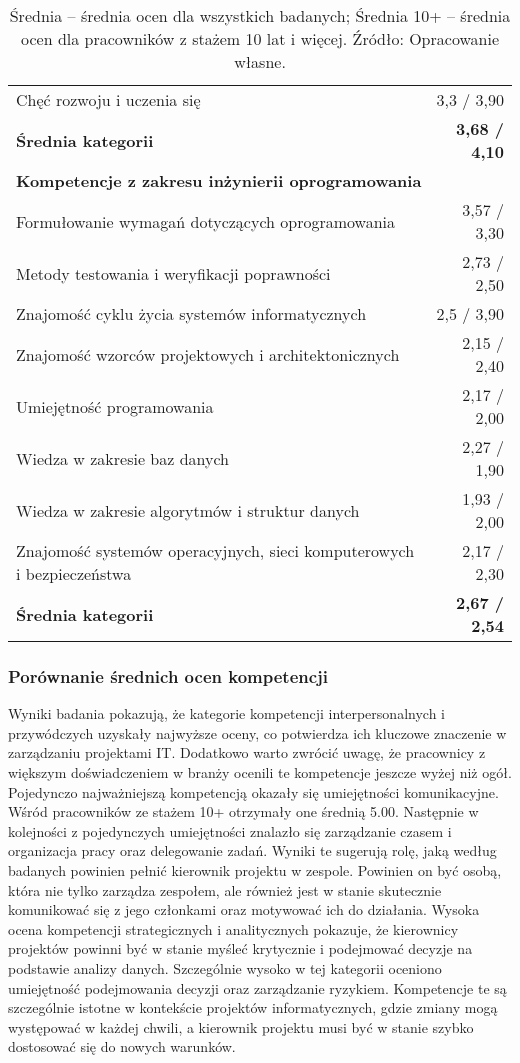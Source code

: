 \begin{table}[htbp]
\begin{tabular}{p{8cm} r}
Chęć rozwoju i uczenia się & 3{,}3 / 3{,}90 \\
\textbf{Średnia kategorii} & \textbf{3{,}68 / 4{,}10} \\
\midrule
\multicolumn{2}{l}{\textbf{Kompetencje z zakresu inżynierii oprogramowania}} \\
Formułowanie wymagań dotyczących oprogramowania & 3{,}57 / 3{,}30 \\
Metody testowania i weryfikacji poprawności & 2{,}73 / 2{,}50 \\
Znajomość cyklu życia systemów informatycznych & 2{,}5 / 3{,}90 \\
Znajomość wzorców projektowych i architektonicznych & 2{,}15 / 2{,}40 \\
Umiejętność programowania & 2{,}17 / 2{,}00 \\
Wiedza w zakresie baz danych & 2{,}27 / 1{,}90 \\
Wiedza w zakresie algorytmów i struktur danych & 1{,}93 / 2{,}00 \\
Znajomość systemów operacyjnych, sieci komputerowych i bezpieczeństwa & 2{,}17 / 2{,}30 \\
\textbf{Średnia kategorii} & \textbf{2{,}67 / 2{,}54} \\
\bottomrule
\end{tabular}
\caption*{Średnia – średnia ocen dla wszystkich badanych; Średnia 10+ – średnia ocen dla pracowników z stażem 10 lat i więcej. Źródło: Opracowanie własne.}
\end{table}

\subsubsection{Porównanie średnich ocen kompetencji}

Wyniki badania pokazują, że kategorie kompetencji interpersonalnych i przywódczych uzyskały najwyższe oceny, co potwierdza ich kluczowe znaczenie w zarządzaniu projektami IT. Dodatkowo warto zwrócić uwagę, że pracownicy z większym doświadczeniem w branży ocenili te kompetencje jeszcze wyżej niż ogół. Pojedynczo najważniejszą kompetencją okazały się umiejętności komunikacyjne. Wśród pracowników ze stażem 10+ otrzymały one średnią 5.00. Następnie w kolejności z pojedynczych umiejętności znalazło się zarządzanie czasem i organizacja pracy oraz delegowanie zadań. Wyniki te sugerują rolę, jaką według badanych powinien pełnić kierownik projektu w zespole. Powinien on być osobą, która nie tylko zarządza zespołem, ale również jest w stanie skutecznie komunikować się z jego członkami oraz motywować ich do działania. Wysoka ocena kompetencji strategicznych i analitycznych pokazuje, że kierownicy projektów powinni być w stanie myśleć krytycznie i podejmować decyzje na podstawie analizy danych. Szczególnie wysoko w tej kategorii oceniono umiejętność podejmowania decyzji oraz zarządzanie ryzykiem. Kompetencje te są szczególnie istotne w kontekście projektów informatycznych, gdzie zmiany mogą występować w każdej chwili, a kierownik projektu musi być w stanie szybko dostosować się do nowych warunków.


